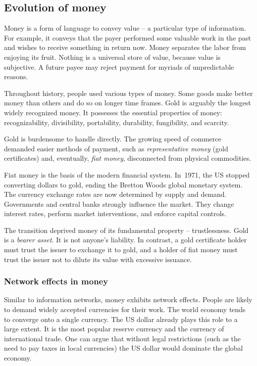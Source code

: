 \subsection{Evolution of money}

Money is a form of language to convey value -- a particular type of information.
For example, it conveys that the payer performed some valuable work in the past and wishes to receive something in return now.
Money separates the labor from enjoying its fruit.
Nothing is a universal store of value, because value is subjective.
A future payee may reject payment for myriads of unpredictable reasons.

Throughout history, people used various types of money.
Some goods make better money than others and do so on longer time frames.
Gold is arguably the longest widely recognized money.
It possesses the essential properties of money: recognizability, divisibility, portability, durability, fungibility, and scarcity.

Gold is burdensome to handle directly.
The growing speed of commerce demanded easier methods of payment, such as \textit{representative money} (gold certificates) and, eventually, \textit{fiat money}, disconnected from physical commodities.

Fiat money is the basis of the modern financial system.
In~1971, the US stopped converting dollars to gold, ending the Bretton Woods global monetary system.
The currency exchange rates are now determined by supply and demand.
Governments and central banks strongly influence the market.
They change interest rates, perform market interventions, and enforce capital controls.

The transition deprived money of its fundamental property -- trustlessness.
Gold is a \textit{bearer asset}.
It is not anyone's liability.
In contrast, a gold certificate holder must trust the issuer to exchange it to gold, and a holder of fiat money must trust the issuer not to dilute its value with excessive issuance.


\subsubsection*{Network effects in money}

Similar to information networks, money exhibits network effects.
People are likely to demand widely accepted currencies for their work.
The world economy tends to converge onto a single currency.
The US dollar already plays this role to a large extent.
It is the most popular reserve currency and the currency of international trade.
One can argue that without legal restrictions (such as the need to pay taxes in local currencies) the US dollar would dominate the global economy.

